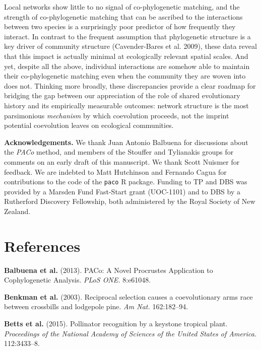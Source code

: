 \documentclass[12pt]{article}
\begin{document}
Local networks show little to no signal of co-phylogenetic matching, and
the strength of co-phylogenetic matching that can be ascribed to the
interactions between two species is a surprisingly poor predictor of how
frequently they interact. In contrast to the frequent assumption that
phylogenetic structure is a key driver of community structure
(Cavender-Bares et al. 2009), these data reveal that this impact is
actually minimal at ecologically relevant spatial scales. And yet,
despite all the above, individual interactions are somehow able to
maintain their co-phylogenetic matching even when the community they are
woven into does not. Thinking more broadly, these discrepancies provide
a clear roadmap for bridging the gap between our appreciation of the
role of shared evolutionary history and its empirically measurable
outcomes: network structure is the most parsimonious \emph{mechanism} by
which coevolution proceeds, not the imprint potential coevolution leaves
on ecological communities.

\textbf{Acknowledgements.} We thank Juan Antonio Balbuena for
discussions about the \emph{PACo} method, and members of the Stouffer
and Tylianakis groups for comments on an early draft of this manuscript.
We thank Scott Nuismer for feedback. We are indebted to Matt Hutchinson
and Fernando Cagua for contributions to the code of the \lstinline!paco!
R package. Funding to TP and DBS was provided by a Marsden Fund
Fast-Start grant (UOC-1101) and to DBS by a Rutherford Discovery
Fellowship, both administered by the Royal Society of New Zealand.

\section*{References}\label{references}

\hypertarget{refs}{}
\hypertarget{ref-balb13pnp}{}
\textbf{Balbuena et al.} (2013). PACo: A Novel Procrustes Application to
Cophylogenetic Analysis. \emph{PLoS ONE.} 8:e61048.

\hypertarget{ref-benk03rsc}{}
\textbf{Benkman et al.} (2003). Reciprocal selection causes a
coevolutionary arms race between crossbills and lodgepole pine. \emph{Am
Nat.} 162:182--94.

\hypertarget{ref-bett15prk}{}
\textbf{Betts et al.} (2015). Pollinator recognition by a keystone
tropical plant. \emph{Proceedings of the National Academy of Sciences of
the United States of America.} 112:3433--8.
\end{document}
